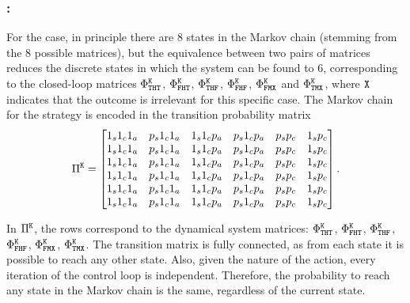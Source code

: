 \subsubsection*{\tK{}:}
For the \tK{} case, in principle there are $8$ states in the Markov chain (stemming from the $8$ possible matrices), but the equivalence between two pairs of matrices reduces the discrete states in which the system can be found to $6$, corresponding to the closed-loop matrices $\Phi^{\texttt{K}}_{\texttt{T}\texttt{H}\texttt{T}}$, $\Phi^{\texttt{K}}_{\texttt{F}\texttt{H}\texttt{T}}$, $\Phi^{\texttt{K}}_{\texttt{T}\texttt{H}\texttt{F}}$, $\Phi^{\texttt{K}}_{\texttt{F}\texttt{H}\texttt{F}}$, $\Phi^{\texttt{K}}_{\texttt{F}\texttt{M}\texttt{X}}$ and $\Phi^{\texttt{K}}_{\texttt{T}\texttt{M}\texttt{X}}$, where $\texttt{X}$ indicates that the outcome is irrelevant for this specific case.
The Markov chain for the \tK{} strategy is encoded in the transition probability matrix
{\small
\begin{equation}
\label{eq:pikill}
\Pi^{\Kill} = \begin{bmatrix}
        1_s1_c1_a & p_s1_c1_a & 1_s1_cp_a & p_s1_cp_a & p_sp_c & 1_sp_c \\
        1_s1_c1_a & p_s1_c1_a & 1_s1_cp_a & p_s1_cp_a & p_sp_c & 1_sp_c \\
        1_s1_c1_a & p_s1_c1_a & 1_s1_cp_a & p_s1_cp_a & p_sp_c & 1_sp_c \\
        1_s1_c1_a & p_s1_c1_a & 1_s1_cp_a & p_s1_cp_a & p_sp_c & 1_sp_c \\
        1_s1_c1_a & p_s1_c1_a & 1_s1_cp_a & p_s1_cp_a & p_sp_c & 1_sp_c \\
        1_s1_c1_a & p_s1_c1_a & 1_s1_cp_a & p_s1_cp_a & p_sp_c & 1_sp_c \\
\end{bmatrix}.
\end{equation}
}

In $\Pi^{\texttt{K}}$, the rows correspond to the dynamical system matrices: $\Phi^{\texttt{K}}_{\texttt{T}\texttt{H}\texttt{T}}$, $\Phi^{\texttt{K}}_{\texttt{F}\texttt{H}\texttt{T}}$, $\Phi^{\texttt{K}}_{\texttt{T}\texttt{H}\texttt{F}}$, $\Phi^{\texttt{K}}_{\texttt{F}\texttt{H}\texttt{F}}$, $\Phi^{\texttt{K}}_{\texttt{F}\texttt{M}\texttt{X}}$, $\Phi^{\texttt{K}}_{\texttt{T}\texttt{M}\texttt{X}}$.
The transition matrix is fully connected, as from each state it is possible to reach any other state.
Also, given the nature of the \tK{} action, every iteration of the control loop is independent.
Therefore, the probability to reach any state in the Markov chain is the same, regardless of the current state.

